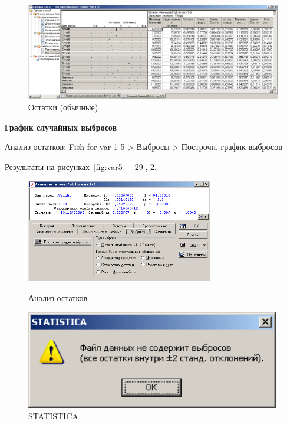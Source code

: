 \begin{figure}[!h]
  \centering

  \includegraphics[width=17cm]
  {inc/var5__28.PNG}

  \caption{Остатки (обычные)}

  \label{fig:var5__28}
\end{figure}

\newpage

\textbf{График случайных выбросов}

Анализ остатков: Fish for var 1-5 > Выбросы > Построчн. график выбросов

Результаты на рисунках~\ref{fig:var5__29}, \ref{fig:var5__30}.

\begin{figure}[!h]
  \centering
  \begin{minipage}{0.49\textwidth}
    \centering

    \includegraphics[height=4.5cm]
    {inc/var5__29.PNG}

    \caption{Анализ остатков}
    \label{fig:var5__29}
  \end{minipage}
  \begin{minipage}{0.49\textwidth}
    \centering

    \includegraphics[width=0.99\textwidth]
    {inc/var5__30.PNG}

    \caption{STATISTICA}
    \label{fig:var5__30}
  \end{minipage}
\end{figure}


